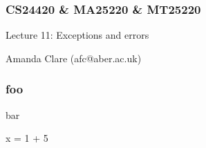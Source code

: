 \documentclass{beamer}
\begin{document}

\begin{frame}
\frametitle{CS24420 \& MA25220 \& MT25220}

\begin{center}
\begin{huge}
Lecture 11: Exceptions and errors
\end{huge}
\bigskip

Amanda Clare (afc@aber.ac.uk)

\end{center}
\end{frame}


\begin{frame}[fragile]
\frametitle{foo}
bar
\begin{code}
x = 1 + 5
\end{code}
\end{frame}
\end{document}
